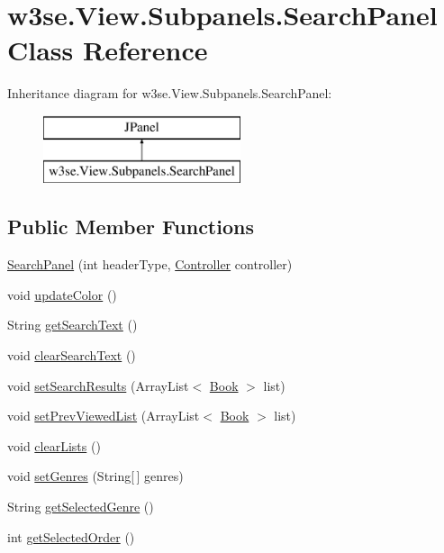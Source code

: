 \hypertarget{classw3se_1_1_view_1_1_subpanels_1_1_search_panel}{\section{w3se.\-View.\-Subpanels.\-Search\-Panel Class Reference}
\label{classw3se_1_1_view_1_1_subpanels_1_1_search_panel}
}
Inheritance diagram for w3se.\-View.\-Subpanels.\-Search\-Panel\-:\begin{figure}[H]
\begin{center}
\leavevmode
\includegraphics[height=2.000000cm]{classw3se_1_1_view_1_1_subpanels_1_1_search_panel}
\end{center}
\end{figure}
\subsection*{Public Member Functions}
\begin{DoxyCompactItemize}
\item 
\hyperlink{classw3se_1_1_view_1_1_subpanels_1_1_search_panel_ab6790487d656f00f100267823d4e4767}{Search\-Panel} (int header\-Type, \hyperlink{interfacew3se_1_1_controller_1_1_controller}{Controller} controller)
\item 
void \hyperlink{classw3se_1_1_view_1_1_subpanels_1_1_search_panel_a53ad09a72fc9106c53086777f767a5d7}{update\-Color} ()
\item 
String \hyperlink{classw3se_1_1_view_1_1_subpanels_1_1_search_panel_a4c63cd2b74d3b1e092722263f194785b}{get\-Search\-Text} ()
\item 
void \hyperlink{classw3se_1_1_view_1_1_subpanels_1_1_search_panel_aaef957aa5e5871fee49f8da4cfce15a8}{clear\-Search\-Text} ()
\item 
void \hyperlink{classw3se_1_1_view_1_1_subpanels_1_1_search_panel_a2dd72d8706db723eff7730e98637b8c9}{set\-Search\-Results} (Array\-List$<$ \hyperlink{classw3se_1_1_model_1_1_base_1_1_book}{Book} $>$ list)
\item 
void \hyperlink{classw3se_1_1_view_1_1_subpanels_1_1_search_panel_aad1e0367d26b3adeb9cf96c407b43a1c}{set\-Prev\-Viewed\-List} (Array\-List$<$ \hyperlink{classw3se_1_1_model_1_1_base_1_1_book}{Book} $>$ list)
\item 
void \hyperlink{classw3se_1_1_view_1_1_subpanels_1_1_search_panel_a458472dbcbba33eab49c5e649abaad50}{clear\-Lists} ()
\item 
void \hyperlink{classw3se_1_1_view_1_1_subpanels_1_1_search_panel_a8ef8db083b4ab52f10cf672ac458178f}{set\-Genres} (String\mbox{[}$\,$\mbox{]} genres)
\item 
String \hyperlink{classw3se_1_1_view_1_1_subpanels_1_1_search_panel_a04bd861dfbaf4d77e271c349ea49feb8}{get\-Selected\-Genre} ()
\item 
int \hyperlink{classw3se_1_1_view_1_1_subpanels_1_1_search_panel_abfac10b7ce2342aed92c0a9f4c343084}{get\-Selected\-Order} ()
\end{DoxyCompactItemize}
